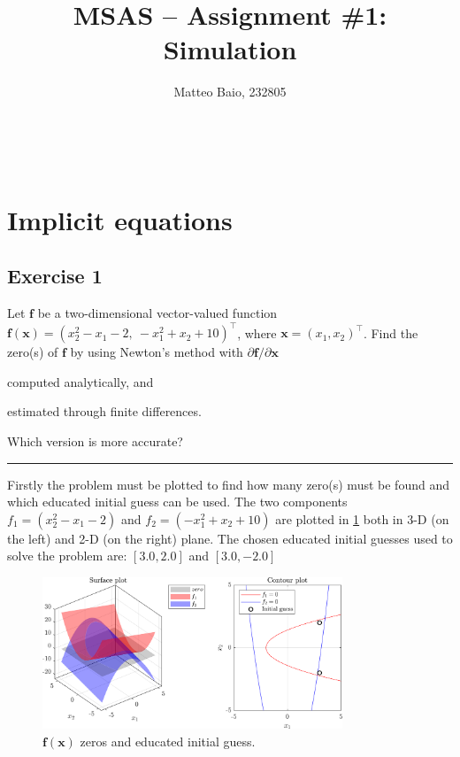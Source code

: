 \documentclass[11pt,a4paper,oneside]{article}
\title{MSAS -- Assignment \#1: Simulation}  %
\author{\large Matteo Baio, 232805}
\date{}
\makeatletter
\renewcommand{\vec}[1]{\mathbf{#1}}
\newcommand\headlinecolor{\normalcolor}
\renewcommand*\maketitle{
    \begingroup
    \centering
    \fontsize{14.4}{14.4}       %
    \selectfont
    \headlinecolor
    \@title\\
    \vspace{5mm}
    \@author
    \par
    \vskip1in
    \endgroup
    \vspace{-22mm}
}
\makeatother
\begin{document}
\maketitle
\thispagestyle{fancy}

\section{Implicit equations}
\subsection{Exercise 1}
Let $\vec{f}$ be a two-dimensional vector-valued function $\vec{f}(\vec{x}) = (x_2^2-x_1-2, \ -x_1^2+x_2+10)^\top$,
where $\vec{x} = (x_1, x_2)^\top$. Find the zero(s) of $\vec{f}$ by using Newton's method with $\partial\vec f/\partial\vec x$ 
\begin{enumerate*}[label=\arabic*)]
    \item computed analytically, and
    \item estimated through finite differences.
\end{enumerate*}
Which version is more accurate?

\medskip
\hrule
\medskip

Firstly the problem must be plotted to find how many zero(s) must be found and which educated initial guess can be used.
The two components $f_1=(x_2^2-x_1-2)$ and $f_2=(-x_1^2+x_2+10)$ are plotted in \cref{fig:ex1_initGuess} both in 3-D (on the left) and 2-D (on the right) plane.
The chosen educated initial guesses used to solve the problem are: $[3.0,2.0]$ and $[3.0,-2.0]$

\begin{figure}[htb]
    \centering
    \includegraphics*[width=0.8\textwidth, keepaspectratio]{ex1_initGuess.png}
    \caption[]{\label{fig:ex1_initGuess} $\vec{f}(\vec{x})$ zeros and educated initial guess.}
\end{figure}
\end{document}
